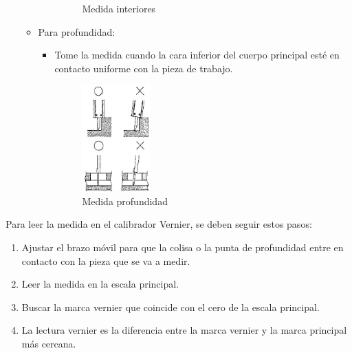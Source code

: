 \documentclass{article}
\theoremstyle{mytheoremstyle}
\theoremstyle{mytheoremstyle}
\theoremstyle{myproblemstyle}
\begin{document}
\begin{enumerate}
\begin{itemize}
\begin{itemize}
\begin{figure}[H]
				                  \caption{Medida interiores}
				                  \label{fig:imagen2}
			                  \end{figure}
		            \end{itemize}
		      \item Para profundidad:
		            \begin{itemize}
			            \item Tome la medida cuando la cara inferior del cuerpo
			                  principal esté en contacto uniforme con la pieza de
			                  trabajo.
			                  \begin{figure}[H]
				                  \centering
				                  \includegraphics[width=0.28\textwidth]{prof.png}
				                  \caption{Medida profundidad}
				                  \label{fig:imagen2}
			                  \end{figure}
		            \end{itemize}
	      \end{itemize}

\end{enumerate}\newpage
Para leer la medida en el calibrador Vernier, se deben seguir estos pasos:

\begin{enumerate}
	\item Ajustar el brazo móvil para que la colisa o la punta de profundidad entre en contacto con la pieza que se va a medir.
	\item Leer la medida en la escala principal.
	\item Buscar la marca vernier que coincide con el cero de la escala principal.
	\item La lectura vernier es la diferencia entre la marca vernier y la marca principal más cercana.
\end{enumerate}
\end{document}
